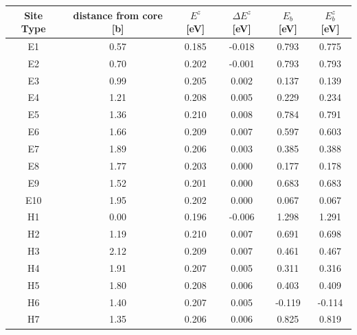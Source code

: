 \documentclass[a4paper,11pt]{article}
\begin{document}
{\begin{table}
\label{orgf8b7020}
    \begin{tabular}{cccccc}
    \hline
Site Type & distance from core [b] & $E^{z}$ [eV] & $\Delta E^{z}$ [eV] & $E_b$ [eV] & $E_b^{z}$ [eV]  \\ 
     \hline
E1        &                   0.57 &   0.185      & 	     -0.018 &       0.793 &          0.775 \\
E2        &                   0.70 &   0.202      & 	     -0.001 &       0.793 &          0.793 \\
E3        &                   0.99 &   0.205      & 	      0.002 &       0.137 &          0.139 \\
E4        &                   1.21 &   0.208      & 	      0.005 &       0.229 &          0.234 \\
E5        &                   1.36 &   0.210      & 	      0.008 &       0.784 &          0.791 \\
E6        &                   1.66 &   0.209      & 	      0.007 &       0.597 &          0.603 \\
E7        &                   1.89 &   0.206      & 	      0.003 &       0.385 &          0.388 \\
E8        &                   1.77 &   0.203      & 	      0.000 &       0.177 &          0.178 \\
E9        &                   1.52 &   0.201      & 	      0.000 &       0.683 &          0.683 \\
E10       &                   1.95 &   0.202      & 	      0.000 &       0.067 &          0.067 \\ \hline
H1        &                   0.00 &   0.196      & 	     -0.006 &       1.298 &          1.291 \\
H2        &                   1.19 &   0.210      & 	      0.007 &       0.691 &          0.698 \\
H3        &                   2.12 &   0.209      & 	      0.007 &       0.461 &          0.467 \\
H4        &                   1.91 &   0.207      & 	      0.005 &       0.311 &          0.316 \\
H5        &                   1.80 &   0.208      & 	      0.006 &       0.403 &          0.409 \\
H6        &                   1.40 &   0.207      & 	      0.005 &      -0.119 &         -0.114 \\
H7        &                   1.35 &   0.206      & 	      0.006 &       0.825 &          0.819 \\


\end{tabular}
\end{table}}
\end{document}

